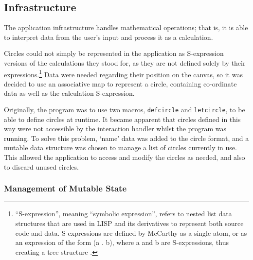 \documentclass[12pt,twoside,notitlepage,xetex]{report}
\begin{document}
\subsection{Infrastructure}

The application infrastructure handles mathematical operations; that is, it is able to interpret data from the user's input and process it as a calculation.

Circles could not simply be represented in the application as S-expression versions of the calculations they stood for, as they are not defined solely by their expressions.\footnote{``S-expression'', meaning ``symbolic expression'', refers to nested list data structures that are used in LISP and its derivatives to represent both source code and data.  S-expressions are defined by McCarthy as a single atom, or as an expression of the form {\ttfamily (a . b)}, where {\ttfamily a} and {\ttfamily b} are S-expressions, thus creating a tree structure \cite{McCarthy1960}.}  Data were needed regarding their position on the canvas, so it was decided to use an associative map to represent a circle, containing co-ordinate data as well as the calculation S-expression.

Originally, the program was to use two macros, \verb¬defcircle¬ and \verb¬letcircle¬, to be able to define circles at runtime.  It became apparent that circles defined in this way were not accessible by the interaction handler whilst the program was running.  To solve this problem, `name' data was added to the circle format, and a mutable data structure was chosen to manage a list of circles currently in use.  This allowed the application to access and modify the circles as needed, and also to discard unused circles.

\subsubsection{Management of Mutable State}
\end{document}
